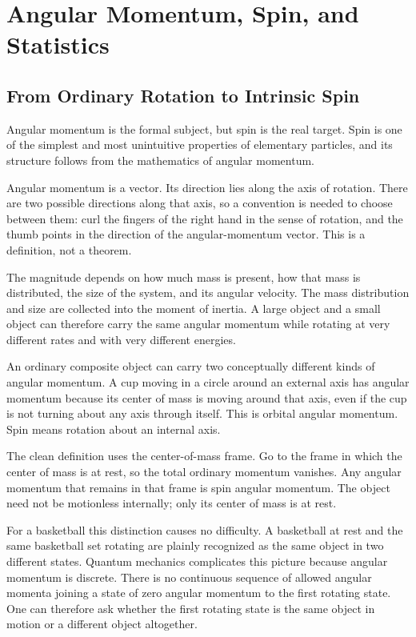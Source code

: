 \chapter{Angular Momentum, Spin, and Statistics}

\section{From Ordinary Rotation to Intrinsic Spin}

Angular momentum is the formal subject, but spin is the real target. Spin is one of the simplest and most unintuitive properties of elementary particles, and its structure follows from the mathematics of angular momentum.

Angular momentum is a vector. Its direction lies along the axis of rotation. There are two possible directions along that axis, so a convention is needed to choose between them: curl the fingers of the right hand in the sense of rotation, and the thumb points in the direction of the angular-momentum vector. This is a definition, not a theorem.

The magnitude depends on how much mass is present, how that mass is distributed, the size of the system, and its angular velocity. The mass distribution and size are collected into the moment of inertia. A large object and a small object can therefore carry the same angular momentum while rotating at very different rates and with very different energies.

An ordinary composite object can carry two conceptually different kinds of angular momentum. A cup moving in a circle around an external axis has angular momentum because its center of mass is moving around that axis, even if the cup is not turning about any axis through itself. This is orbital angular momentum. Spin means rotation about an internal axis.

The clean definition uses the center-of-mass frame. Go to the frame in which the center of mass is at rest, so the total ordinary momentum vanishes. Any angular momentum that remains in that frame is spin angular momentum. The object need not be motionless internally; only its center of mass is at rest.

For a basketball this distinction causes no difficulty. A basketball at rest and the same basketball set rotating are plainly recognized as the same object in two different states. Quantum mechanics complicates this picture because angular momentum is discrete. There is no continuous sequence of allowed angular momenta joining a state of zero angular momentum to the first rotating state. One can therefore ask whether the first rotating state is the same object in motion or a different object altogether.

